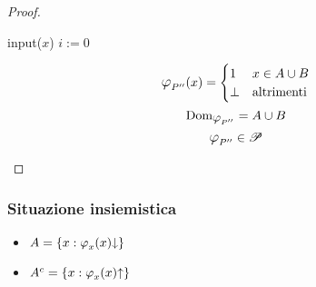 \begin{proof}
\begin{itemize}
            \vspace{.6em}
            \begin{minipage}{.31\textwidth}
                \begin{tcolorbox}[
                    colback=white,
                    sharp corners,
                    boxrule=.3mm,
                    left=20pt,
                    top=0pt,
                    bottom=0pt,
                    title=$P''$,
                    colbacktitle=white,
                    coltitle=black
                ]
                \begin{algorithm}[H]
                    input($x$)\;
                    $i:=0$\;
                \end{algorithm}
                \end{tcolorbox}
            \end{minipage}
            \begin{minipage}{.4\textwidth}
                $$ \semRAM_{P''}(x) = \begin{cases}
                    1 & x\in A\cup B\\
                    \perp & \text{altrimenti}
                \end{cases} $$
                $$\text{Dom}_{\semRAM_{P''}} = A\cup B $$
                $$ \semRAM_{P''} \in \ricPar $$
            \end{minipage}
    \end{itemize}
\end{proof}

\subsubsection*{Situazione insiemistica}
\begin{minipage}{.6\textwidth}
    \begin{center}
        
    \end{center}
\end{minipage}
\begin{minipage}{.35\textwidth}
    \begin{itemize}
        \setlength\itemsep{1.4em}
        \item $A = \{x:\semRAM_x(x)\termina \}$
        \item $A^c = \{x:\semRAM_x(x)\ntermina \}$
    \end{itemize}
\end{minipage}


